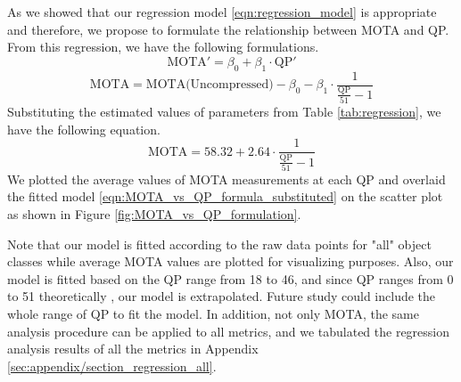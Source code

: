 As we showed that our regression model \eqref{eqn:regression_model} is appropriate and therefore, we propose to formulate the relationship between MOTA and QP. From this regression, we have the following formulations.
\begin{equation}
    \text{MOTA}' = \beta_0 + \beta_1 \cdot \text{QP}'
\end{equation}
\begin{equation}
    \text{MOTA} = \text{MOTA(Uncompressed)} - \beta_0 - \beta_1 \cdot \frac{1}{ \frac{\text{QP}}{51} - 1 }
\label{eqn:MOTA_vs_QP_formula}
\end{equation}
Substituting the estimated values of parameters from Table \ref{tab:regression}, we have the following equation.
\begin{equation}
    \text{MOTA} = 58.32 + 2.64 \cdot \frac{1}{ \frac{\text{QP}}{51} - 1 }
\label{eqn:MOTA_vs_QP_formula_substituted}
\end{equation}
We plotted the average values of MOTA measurements at each QP and overlaid the fitted model \ref{eqn:MOTA_vs_QP_formula_substituted} on the scatter plot as shown in Figure \ref{fig:MOTA_vs_QP_formulation}.

Note that our model is fitted according to the raw data points for "all" object classes while average MOTA values are plotted for visualizing purposes. Also, our model is fitted based on the QP range from 18 to 46, and since QP ranges from 0 to 51 theoretically \cite{sullivan_overview_2012}, our model is extrapolated. Future study could include the whole range of QP to fit the model. In addition, not only MOTA, the same analysis procedure can be applied to all metrics, and we tabulated the regression analysis results of all the metrics in Appendix \ref{sec:appendix/section_regression_all}.


